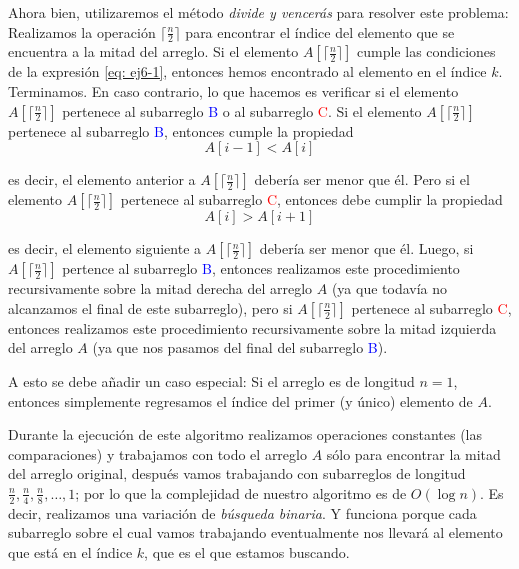 \documentclass[letterpaper,11pt]{article}
\begin{document}
\begin{enumerate}
\begin{enumerate}
        Ahora bien, utilizaremos el método \textit{divide y vencerás} para 
        resolver este problema: Realizamos la operación 
        $\lceil \frac{n}{2} \rceil$ para encontrar el índice del elemento que 
        se encuentra a la mitad del arreglo. Si el elemento 
        $A[\lceil \frac{n}{2} \rceil]$ cumple las condiciones de la expresión 
        \ref{eq: ej6-1}, entonces hemos encontrado al elemento en el índice $k$. 
        Terminamos. En caso contrario, lo que hacemos es verificar si el 
        elemento $A[\lceil \frac{n}{2} \rceil]$ pertenece al subarreglo 
        \textcolor{blue}{B} o al subarreglo \textcolor{red}{C}. Si el elemento 
        $A[\lceil \frac{n}{2} \rceil]$ pertenece al subarreglo 
        \textcolor{blue}{B}, entonces cumple la propiedad 
        \begin{equation}
            \label{eq: ej6-2}
            A[i-1] < A[i]  
        \end{equation}

        es decir, el elemento anterior a $A[\lceil \frac{n}{2} \rceil]$ debería 
        ser menor que él. Pero si el elemento $A[\lceil \frac{n}{2} \rceil]$
        pertenece al subarreglo \textcolor{red}{C}, entonces debe cumplir la 
        propiedad 
        \begin{equation}
            \label{eq: ej6-3}
            A[i] > A[i+1]
        \end{equation}

        es decir, el elemento siguiente a $A[\lceil \frac{n}{2} \rceil]$ debería 
        ser menor que él. Luego, si $A[\lceil \frac{n}{2} \rceil]$ pertence al 
        subarreglo \textcolor{blue}{B}, entonces realizamos este procedimiento
        recursivamente sobre la mitad derecha del arreglo $A$ (ya que todavía no
        alcanzamos el final de este subarreglo), pero si 
        $A[\lceil \frac{n}{2} \rceil]$ pertenece al subarreglo 
        \textcolor{red}{C}, entonces realizamos este procedimiento 
        recursivamente sobre la mitad izquierda del arreglo $A$ (ya que nos 
        pasamos del final del subarreglo \textcolor{blue}{B}).

        A esto se debe añadir un caso especial: Si el arreglo es de longitud 
        $n = 1$, entonces simplemente regresamos el índice del primer (y 
        único) elemento de $A$.

        Durante la ejecución de este algoritmo realizamos operaciones constantes
        (las comparaciones) y trabajamos con todo el arreglo $A$ sólo para 
        encontrar la mitad del arreglo original, después vamos trabajando con 
        subarreglos de longitud $\frac{n}{2}, \frac{n}{4}, \frac{n}{8}, \ldots, 
        1$; por lo que la complejidad de nuestro algoritmo es de $O(\log n)$. 
        Es decir, realizamos una variación de \textit{búsqueda binaria}. Y 
        funciona porque cada subarreglo sobre el cual vamos trabajando 
        eventualmente nos llevará al elemento que está en el índice $k$, que 
        es el que estamos buscando. 
        

\end{enumerate}
\end{enumerate}
\end{document}
